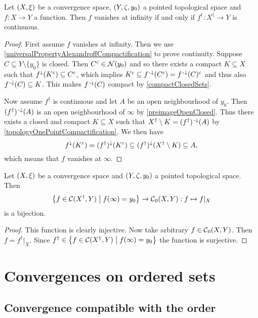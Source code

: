 \begin{proposition} \label{vanishesAtInfinityIffBasepointExtensionContinuous}
Let $\sSet{X,\xi}$ be a convergence space, $\sSet{Y,\zeta, y_0}$ a pointed topological space and $f:X\to Y$ a function. Then $f$ vanishes at infinity \textup{if and only if} $f^\dagger: X^\dagger \to Y$ is continuous.
\end{proposition}
\begin{proof}
First assume $f$ vanishes at infinity. Then we use \ref{universalPropertyAlexandroffCompactification} to prove continuity. Suppose $C\subseteq Y\setminus\{y_0\}$ is closed. Then $C^c \in \operatorname{\mathcal{N}}(y_0)$ and so there exists a compact $K\subseteq X$ such that $f^\downarrow(K^c)\subseteq C^c$, which implies $K^c \subseteq f^{\text{\hspace{0.15em}-}\downarrow}(C^c) = f^{\text{\hspace{0.15em}-}\downarrow}(C)^c$ and thus also $f^{\text{\hspace{0.15em}-}\downarrow}(C)\subseteq K$. This makes $f^{\text{\hspace{0.15em}-}\downarrow}(C)$ compact by \ref{compactClosedSets}.

Now assume $f^\dagger$ is continuous and let $A$ be an open neighbourhood of $y_0$. Then $(f^\dagger)^{\text{\hspace{0.15em}-}\downarrow}(A)$ is an open neighbourhood of $\infty$ by \ref{preimageOpenClosed}. Thus there exists a closed and compact $K\subseteq X$ such that $X^\dagger\setminus K = (f^\dagger)^{\text{\hspace{0.15em}-}\downarrow}(A)$ by \ref{topologyOnePointCompactification}. We then have
\[ f^\downarrow(K^c) = (f^\dagger)^\downarrow(K^c) \subseteq (f^\dagger)^\downarrow(X^\dagger \setminus K) \subseteq A, \]
which means that $f$ vanishes at $\infty$.
\end{proof}
\begin{corollary} \label{functionVanishingAtInftyIffRestrictionOfContinuousBasepointPreservingFunction}
Let $\sSet{X,\xi}$ be a convergence space and $\sSet{Y,\zeta, y_0}$ a pointed topological space. Then
\[ \setbuilder{f\in \cont(X^\dagger, Y)}{f(\infty) = y_0} \to \cont_0(X,Y): f\mapsto f|_X \]
is a bijection.
\end{corollary}
\begin{proof}
This function is clearly injective. Now take arbitrary $f\in \operatorname{\mathcal{C}}_0(X,Y)$. Then $f = f^\dagger|_X$. Since $f^\dagger\in \setbuilder{f\in \cont(X^\dagger, Y)}{f(\infty) = y_0}$ the function is surjective.
\end{proof}



\section{Convergences on ordered sets}

\subsection{Convergence compatible with the order}

